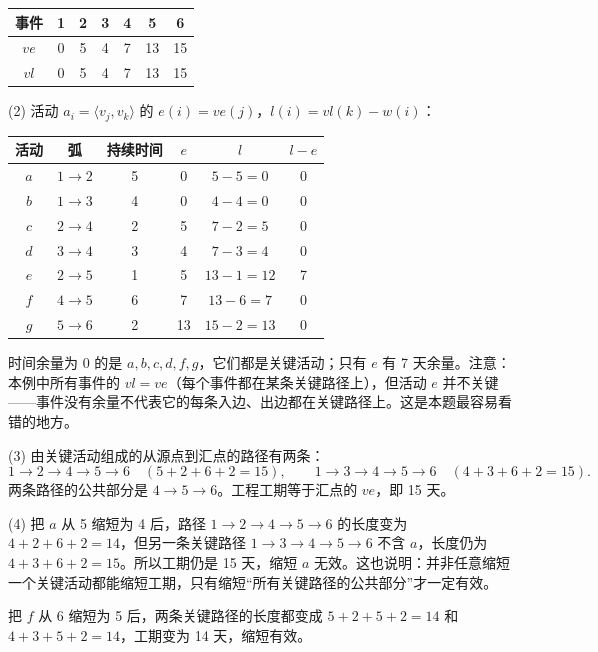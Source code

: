 \begin{enumerate}[resume]
\begin{center}
\small
\begin{tabular}{|c|c|c|c|c|c|c|}
\hline
事件 & 1 & 2 & 3 & 4 & 5 & 6 \\
\hline
$ve$ & 0 & 5 & 4 & 7 & 13 & 15 \\
\hline
$vl$ & 0 & 5 & 4 & 7 & 13 & 15 \\
\hline
\end{tabular}
\end{center}

(2) 活动 $a_i=\langle v_j,v_k\rangle$ 的 $e(i)=ve(j)$，$l(i)=vl(k)-w(i)$：
\begin{center}
\small
\begin{tabular}{|c|c|c|c|c|c|}
\hline
活动 & 弧 & 持续时间 & $e$ & $l$ & $l-e$ \\
\hline
$a$ & $1\to2$ & 5 & 0 & $5-5=0$ & 0 \\
\hline
$b$ & $1\to3$ & 4 & 0 & $4-4=0$ & 0 \\
\hline
$c$ & $2\to4$ & 2 & 5 & $7-2=5$ & 0 \\
\hline
$d$ & $3\to4$ & 3 & 4 & $7-3=4$ & 0 \\
\hline
$e$ & $2\to5$ & 1 & 5 & $13-1=12$ & 7 \\
\hline
$f$ & $4\to5$ & 6 & 7 & $13-6=7$ & 0 \\
\hline
$g$ & $5\to6$ & 2 & 13 & $15-2=13$ & 0 \\
\hline
\end{tabular}
\end{center}
时间余量为 0 的是 $a,b,c,d,f,g$，它们都是关键活动；只有 $e$ 有 7 天余量。注意：本例中所有事件的 $vl=ve$（每个事件都在某条关键路径上），但活动 $e$ 并不关键——事件没有余量不代表它的每条入边、出边都在关键路径上。这是本题最容易看错的地方。

(3) 由关键活动组成的从源点到汇点的路径有两条：
\[
1\to2\to4\to5\to6 \quad(5+2+6+2=15),\qquad
1\to3\to4\to5\to6 \quad(4+3+6+2=15).
\]
两条路径的公共部分是 $4\to5\to6$。工程工期等于汇点的 $ve$，即 15 天。

(4) 把 $a$ 从 5 缩短为 4 后，路径 $1\to2\to4\to5\to6$ 的长度变为 $4+2+6+2=14$，但另一条关键路径 $1\to3\to4\to5\to6$ 不含 $a$，长度仍为 $4+3+6+2=15$。所以工期仍是 15 天，缩短 $a$ 无效。这也说明：并非任意缩短一个关键活动都能缩短工期，只有缩短“所有关键路径的公共部分”才一定有效。

把 $f$ 从 6 缩短为 5 后，两条关键路径的长度都变成 $5+2+5+2=14$ 和 $4+3+5+2=14$，工期变为 14 天，缩短有效。

\else \answerarea[16] \fi

\end{enumerate}
